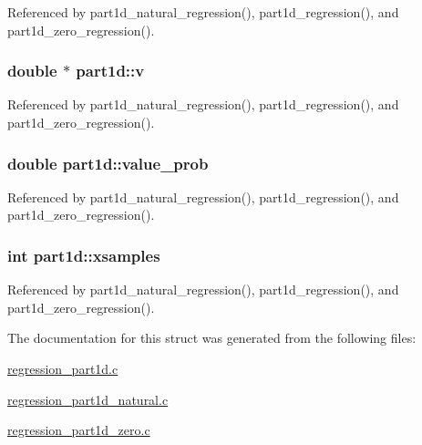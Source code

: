 Referenced by part1d\+\_\+natural\+\_\+regression(), part1d\+\_\+regression(), and part1d\+\_\+zero\+\_\+regression().

\subsubsection[{\texorpdfstring{v}{v}}]{\setlength{\rightskip}{0pt plus 5cm}double $\ast$ part1d\+::v}\hypertarget{structpart1d_a51e5fae9ad993ca788b0d842d3ac5d61}{}\label{structpart1d_a51e5fae9ad993ca788b0d842d3ac5d61}


Referenced by part1d\+\_\+natural\+\_\+regression(), part1d\+\_\+regression(), and part1d\+\_\+zero\+\_\+regression().

\subsubsection[{\texorpdfstring{value\+\_\+prob}{value_prob}}]{\setlength{\rightskip}{0pt plus 5cm}double part1d\+::value\+\_\+prob}\hypertarget{structpart1d_ad5ea1e509232c5cda8d492ad1f96b8cb}{}\label{structpart1d_ad5ea1e509232c5cda8d492ad1f96b8cb}


Referenced by part1d\+\_\+natural\+\_\+regression(), part1d\+\_\+regression(), and part1d\+\_\+zero\+\_\+regression().

\subsubsection[{\texorpdfstring{xsamples}{xsamples}}]{\setlength{\rightskip}{0pt plus 5cm}int part1d\+::xsamples}\hypertarget{structpart1d_ae2195f767f3cd44a72bf712445ea1b4c}{}\label{structpart1d_ae2195f767f3cd44a72bf712445ea1b4c}


Referenced by part1d\+\_\+natural\+\_\+regression(), part1d\+\_\+regression(), and part1d\+\_\+zero\+\_\+regression().



The documentation for this struct was generated from the following files\+:\begin{DoxyCompactItemize}
\item 
\hyperlink{regression__part1d_8c}{regression\+\_\+part1d.\+c}\item 
\hyperlink{regression__part1d__natural_8c}{regression\+\_\+part1d\+\_\+natural.\+c}\item 
\hyperlink{regression__part1d__zero_8c}{regression\+\_\+part1d\+\_\+zero.\+c}\end{DoxyCompactItemize}
